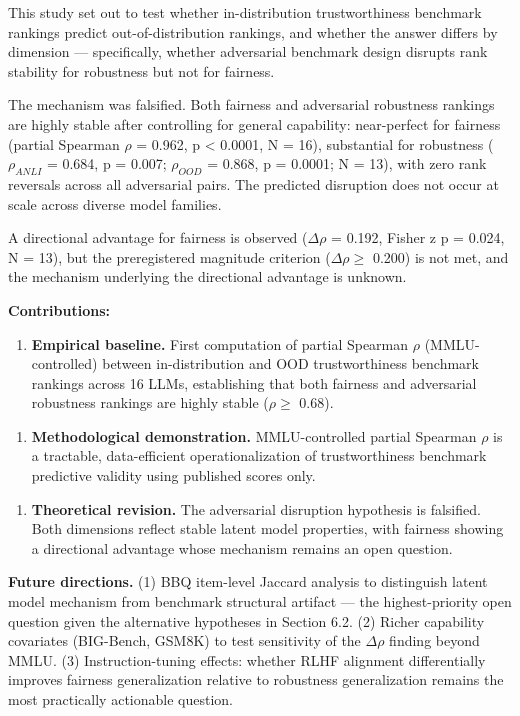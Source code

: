 
This study set out to test whether in-distribution trustworthiness benchmark rankings predict out-of-distribution rankings, and whether the answer differs by dimension --- specifically, whether adversarial benchmark design disrupts rank stability for robustness but not for fairness.

The mechanism was falsified. Both fairness and adversarial robustness rankings are highly stable after controlling for general capability: near-perfect for fairness (partial Spearman $\rho$ = 0.962, p < 0.0001, N = 16), substantial for robustness ($\rho_{ANLI}$ = 0.684, p = 0.007; $\rho_{OOD}$ = 0.868, p = 0.0001; N = 13), with zero rank reversals across all adversarial pairs. The predicted disruption does not occur at scale across diverse model families.

A directional advantage for fairness is observed ($\Delta\rho$ = 0.192, Fisher z p = 0.024, N = 13), but the preregistered magnitude criterion ($\Delta\rho \geq$ 0.200) is not met, and the mechanism underlying the directional advantage is unknown.

\textbf{Contributions:}

\begin{enumerate}
\item \textbf{Empirical baseline.} First computation of partial Spearman $\rho$ (MMLU-controlled) between in-distribution and OOD trustworthiness benchmark rankings across 16 LLMs, establishing that both fairness and adversarial robustness rankings are highly stable ($\rho \geq$ 0.68).
\end{enumerate}

\begin{enumerate}
\item \textbf{Methodological demonstration.} MMLU-controlled partial Spearman $\rho$ is a tractable, data-efficient operationalization of trustworthiness benchmark predictive validity using published scores only.
\end{enumerate}

\begin{enumerate}
\item \textbf{Theoretical revision.} The adversarial disruption hypothesis is falsified. Both dimensions reflect stable latent model properties, with fairness showing a directional advantage whose mechanism remains an open question.
\end{enumerate}

\textbf{Future directions.} (1) BBQ item-level Jaccard analysis to distinguish latent model mechanism from benchmark structural artifact --- the highest-priority open question given the alternative hypotheses in Section 6.2. (2) Richer capability covariates (BIG-Bench, GSM8K) to test sensitivity of the $\Delta\rho$ finding beyond MMLU. (3) Instruction-tuning effects: whether RLHF alignment differentially improves fairness generalization relative to robustness generalization remains the most practically actionable question.

